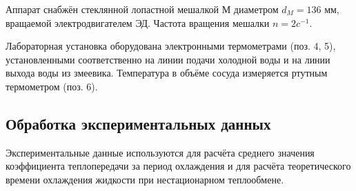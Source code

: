 \documentclass[12pt, a4paper]{article}
\begin{document}
Аппарат снабжён стеклянной лопастной мешалкой М диаметром $d_{M} = 136$ мм, 
вращаемой электродвигателем ЭД. Частота вращения мешалки $n = 2c^{-1}$.

Лабораторная установка оборудована электронными термометрами
(поз. 4, 5), установленными соответственно на линии подачи холодной воды и на линии выхода воды из змеевика. Температура в объёме сосуда измеряется ртутным термометром (поз. 6).


\newpage
\begin{center}
\subsection*{Обработка экспериментальных данных}
\end{center}

Экспериментальные данные используются для расчёта среднего значения коэффициента теплопередачи за период охлаждения и для расчёта
теоретического времени охлаждения жидкости при нестационарном теплообмене.
\end{document}
